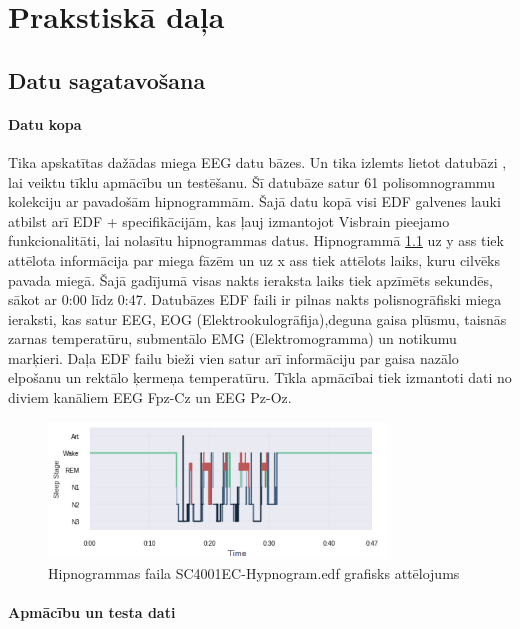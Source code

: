 \documentclass[12pt,paper=A4]{report}
\begin{document}
\chapter{Prakstiskā daļa}


\section{Datu sagatavošana}
\subsubsection{Datu kopa}
Tika apskatītas dažādas miega EEG datu bāzes. Un tika izlemts lietot datubāzi \cite{goldberger2000physiobank}, lai veiktu tīklu apmācību un testēšanu. Šī datubāze satur 61 polisomnogrammu kolekciju ar pavadošām hipnogrammām. Šajā datu kopā visi EDF galvenes lauki atbilst arī EDF + specifikācijām, kas ļauj izmantojot Visbrain pieejamo funkcionalitāti, lai nolasītu hipnogrammas datus. Hipnogrammā \ref{hypnoGramS} uz y ass tiek attēlota informācija par miega fāzēm un uz x ass tiek attēlots laiks, kuru cilvēks pavada miegā. Šajā gadījumā visas nakts ieraksta laiks tiek apzīmēts sekundēs, sākot ar 0:00 līdz 0:47. Datubāzes EDF faili ir pilnas nakts polisnogrāfiski miega ieraksti, kas satur EEG, EOG (Elektrookulogrāfija),deguna gaisa plūsmu, taisnās zarnas temperatūru, submentālo EMG (Elektromogramma) un notikumu marķieri. Daļa EDF failu bieži vien satur arī informāciju par gaisa nazālo elpošanu un rektālo ķermeņa temperatūru. Tīkla apmācībai tiek izmantoti dati no diviem kanāliem EEG Fpz-Cz un EEG Pz-Oz. 


\begin{figure}[H] \centering
\includegraphics[width=0.80\textwidth]{hipnoHipno} \caption{Hipnogrammas faila SC4001EC-Hypnogram.edf grafisks attēlojums}
\label{hypnoGramS} 
\end{figure}


\subsubsection{Apmācību un testa dati}
\end{document}
